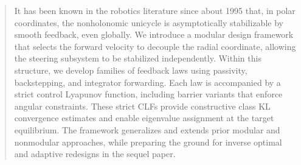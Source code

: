 \documentclass[journal,twoside,web]{ieeecolor}
\theoremstyle{definition}
\begin{document}
\begin{abstract}
It has been known in the robotics literature since about 1995 that, in polar coordinates, the nonholonomic unicycle is asymptotically stabilizable by smooth feedback, even globally. 
We introduce a modular design framework that selects the forward velocity to decouple the radial coordinate, allowing the steering subsystem to be stabilized independently. Within this structure, we develop families of feedback laws using passivity, backstepping, and integrator forwarding. Each law is accompanied by a strict control Lyapunov function, including barrier variants that enforce angular constraints. These strict CLFs provide constructive class KL convergence estimates and enable eigenvalue assignment at the target equilibrium. The framework generalizes and extends prior modular and nonmodular approaches, while preparing the ground for inverse optimal and adaptive redesigns in the sequel paper.


\end{abstract}
\end{document}
